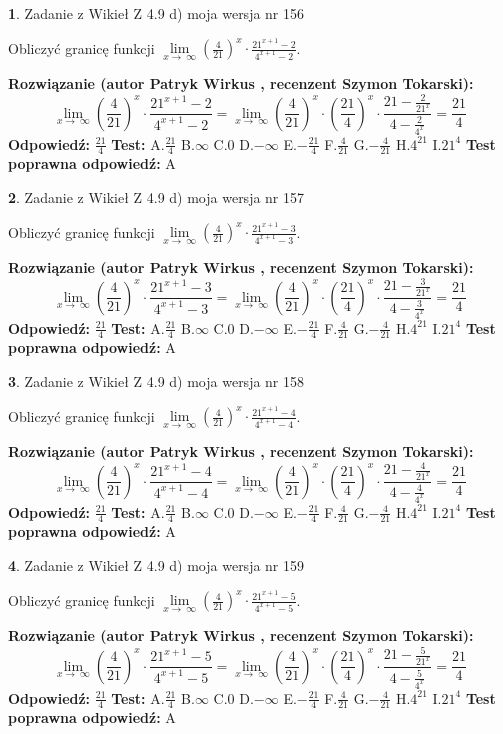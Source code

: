 \documentclass[12pt, a4paper]{article}
\theoremstyle{definition} %
\newtheorem{zad}{}
\newcommand{\zadStart}[1]{\begin{zad}#1\newline}
\newcommand{\zadStop}{\end{zad}}
\newcommand{\rozwStart}[2]{\noindent \textbf{Rozwiązanie (autor #1 , recenzent #2): }\newline}
\newcommand{\rozwStop}{\newline}
\newcommand{\odpStart}{\noindent \textbf{Odpowiedź:}\newline}
\newcommand{\odpStop}{\newline}
\newcommand{\testStart}{\noindent \textbf{Test:}\newline}
\newcommand{\testStop}{\newline}
\newcommand{\kluczStart}{\noindent \textbf{Test poprawna odpowiedź:}\newline}
\newcommand{\kluczStop}{\newline}
\begin{document}
\zadStart{Zadanie z Wikieł Z 4.9 d) moja wersja nr 156}


Obliczyć granicę funkcji  $\lim\limits_{x\to\ \infty}(\frac{4}{21})^{x}\cdot\frac{21^{x+1}-2}{4^{x+1}-2}$.
\zadStop
\rozwStart{Patryk Wirkus}{Szymon Tokarski}
$$\lim\limits_{x\to\ \infty}(\frac{4}{21})^{x}\cdot\frac{21^{x+1}-2}{4^{x+1}-2}=\lim\limits_{x\to\ \infty}(\frac{4}{21})^{x}\cdot(\frac{21}{4})^{x} \cdot \frac{21-\frac{2}{21^{x}}}{4-\frac{2}{4^{x}}} = \frac{21}{4}$$
\rozwStop
\odpStart
$\frac{21}{4}$
\odpStop
\testStart
A.$\frac{21}{4}$ B.$\infty$ C.$0$ D.$-\infty$ E.$-\frac{21}{4}$
F.$\frac{4}{21}$ G.$-\frac{4}{21}$
H.$4^{21}$
I.$21^{4}$
\testStop
\kluczStart
A
\kluczStop



\zadStart{Zadanie z Wikieł Z 4.9 d) moja wersja nr 157}


Obliczyć granicę funkcji  $\lim\limits_{x\to\ \infty}(\frac{4}{21})^{x}\cdot\frac{21^{x+1}-3}{4^{x+1}-3}$.
\zadStop
\rozwStart{Patryk Wirkus}{Szymon Tokarski}
$$\lim\limits_{x\to\ \infty}(\frac{4}{21})^{x}\cdot\frac{21^{x+1}-3}{4^{x+1}-3}=\lim\limits_{x\to\ \infty}(\frac{4}{21})^{x}\cdot(\frac{21}{4})^{x} \cdot \frac{21-\frac{3}{21^{x}}}{4-\frac{3}{4^{x}}} = \frac{21}{4}$$
\rozwStop
\odpStart
$\frac{21}{4}$
\odpStop
\testStart
A.$\frac{21}{4}$ B.$\infty$ C.$0$ D.$-\infty$ E.$-\frac{21}{4}$
F.$\frac{4}{21}$ G.$-\frac{4}{21}$
H.$4^{21}$
I.$21^{4}$
\testStop
\kluczStart
A
\kluczStop



\zadStart{Zadanie z Wikieł Z 4.9 d) moja wersja nr 158}


Obliczyć granicę funkcji  $\lim\limits_{x\to\ \infty}(\frac{4}{21})^{x}\cdot\frac{21^{x+1}-4}{4^{x+1}-4}$.
\zadStop
\rozwStart{Patryk Wirkus}{Szymon Tokarski}
$$\lim\limits_{x\to\ \infty}(\frac{4}{21})^{x}\cdot\frac{21^{x+1}-4}{4^{x+1}-4}=\lim\limits_{x\to\ \infty}(\frac{4}{21})^{x}\cdot(\frac{21}{4})^{x} \cdot \frac{21-\frac{4}{21^{x}}}{4-\frac{4}{4^{x}}} = \frac{21}{4}$$
\rozwStop
\odpStart
$\frac{21}{4}$
\odpStop
\testStart
A.$\frac{21}{4}$ B.$\infty$ C.$0$ D.$-\infty$ E.$-\frac{21}{4}$
F.$\frac{4}{21}$ G.$-\frac{4}{21}$
H.$4^{21}$
I.$21^{4}$
\testStop
\kluczStart
A
\kluczStop



\zadStart{Zadanie z Wikieł Z 4.9 d) moja wersja nr 159}


Obliczyć granicę funkcji  $\lim\limits_{x\to\ \infty}(\frac{4}{21})^{x}\cdot\frac{21^{x+1}-5}{4^{x+1}-5}$.
\zadStop
\rozwStart{Patryk Wirkus}{Szymon Tokarski}
$$\lim\limits_{x\to\ \infty}(\frac{4}{21})^{x}\cdot\frac{21^{x+1}-5}{4^{x+1}-5}=\lim\limits_{x\to\ \infty}(\frac{4}{21})^{x}\cdot(\frac{21}{4})^{x} \cdot \frac{21-\frac{5}{21^{x}}}{4-\frac{5}{4^{x}}} = \frac{21}{4}$$
\rozwStop
\odpStart
$\frac{21}{4}$
\odpStop
\testStart
A.$\frac{21}{4}$ B.$\infty$ C.$0$ D.$-\infty$ E.$-\frac{21}{4}$
F.$\frac{4}{21}$ G.$-\frac{4}{21}$
H.$4^{21}$
I.$21^{4}$
\testStop
\kluczStart
A
\kluczStop
\end{document}

